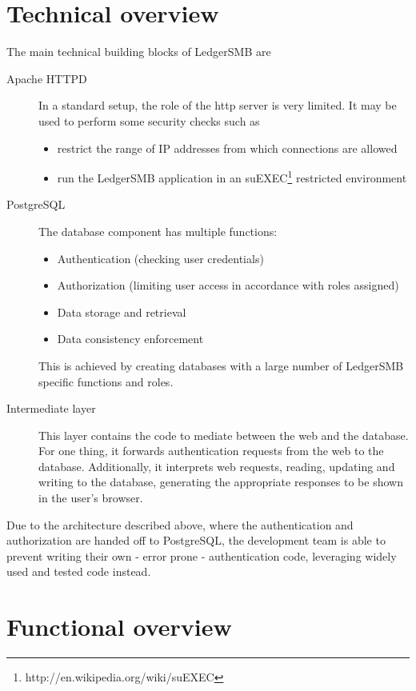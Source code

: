 \section{Technical overview}




The main technical building blocks of LedgerSMB are

\begin{description}
\item[Apache HTTPD] In a standard setup, the role of the http server is very limited. It
may be used to perform some security checks such as
\begin{itemize}
\item restrict the range of IP addresses from which connections are allowed
\item run the LedgerSMB application in an
suEXEC\footnote{http://en.wikipedia.org/wiki/suEXEC} restricted environment
\end{itemize}
\item[PostgreSQL] The database component has multiple functions:
\begin{itemize}
\item Authentication (checking user credentials)
\item Authorization (limiting user access in accordance with roles assigned)
\item Data storage and retrieval
\item Data consistency enforcement
\end{itemize}
This is achieved by creating databases with a large number of LedgerSMB specific
functions and roles.
\item[Intermediate layer] This layer contains the code to mediate between the web
and the database.  For one thing, it forwards authentication requests from the web
to the database.  Additionally, it interprets web requests, reading, updating and
writing to the database, generating the appropriate responses to be shown in the
user's browser.
\end{description}

Due to the architecture described above, where the authentication and authorization
are handed off to PostgreSQL, the development team is able to prevent writing their
own - error prone - authentication code, leveraging widely used and tested code instead.


\section{Functional overview}

